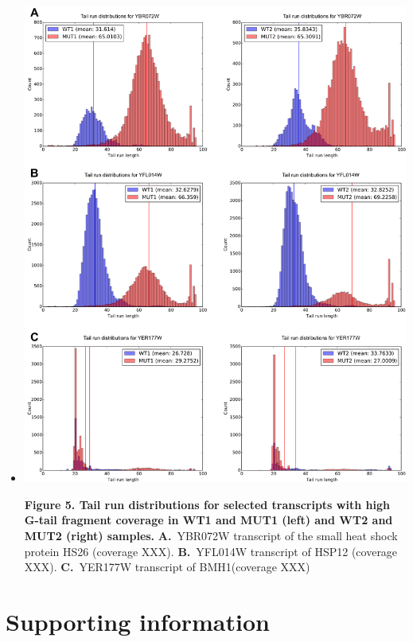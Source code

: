\documentclass[10pt]{article}
\begin{document}
\begin{itemize}
\item[]{
\includegraphics[scale=0.8]{Figure5.png}

\textbf{Figure 5. Tail run distributions for selected transcripts with high G-tail fragment coverage in WT1 and MUT1 (left) and 
WT2 and MUT2 (right) samples.} \textbf{A.}~YBR072W transcript of the small heat shock protein HS26 (coverage XXX). \textbf{B.}~YFL014W transcript of HSP12 (coverage XXX). \textbf{C.}~YER177W transcript of BMH1(coverage XXX)
}

\end{itemize}

\section*{Supporting information}
\end{document}
